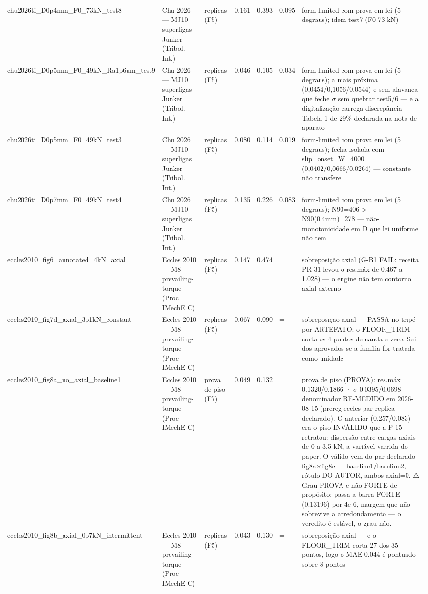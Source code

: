 \begin{table}[t]
\begin{tabular}{lllllll}
chu2026ti\_D0p4mm\_F0\_73kN\_test8 & Chu 2026 — MJ10 superligas Junker (Tribol. Int.) & replicas (F5) & 0.161 & 0.393 & 0.095 & form-limited com prova em lei (5 degraus); idem test7 (F0 73 kN) \\
chu2026ti\_D0p5mm\_F0\_49kN\_Ra1p6um\_test9 & Chu 2026 — MJ10 superligas Junker (Tribol. Int.) & replicas (F5) & 0.046 & 0.105 & 0.034 & form-limited com prova em lei (5 degraus); a mais próxima (0,0454/0,1056/0,0544) e sem alavanca que feche $\sigma$ sem quebrar test5/6 — e a digitalização carrega discrepância Tabela-1 de 29\% declarada na nota de aparato \\
chu2026ti\_D0p5mm\_F0\_49kN\_test3 & Chu 2026 — MJ10 superligas Junker (Tribol. Int.) & replicas (F5) & 0.080 & 0.114 & 0.019 & form-limited com prova em lei (5 degraus); fecha isolada com slip\_onset\_W=4000 (0,0402/0,0666/0,0264) — constante não transfere \\
chu2026ti\_D0p7mm\_F0\_49kN\_test4 & Chu 2026 — MJ10 superligas Junker (Tribol. Int.) & replicas (F5) & 0.135 & 0.226 & 0.083 & form-limited com prova em lei (5 degraus); N90=406 > N90(0,4mm)=278 — não-monotonicidade em D que lei uniforme não tem \\
eccles2010\_fig6\_annotated\_4kN\_axial & Eccles 2010 — M8 prevailing-torque (Proc IMechE C) & replicas (F5) & 0.147 & 0.474 & = & sobreposição axial (G-B1 FAIL: receita PR-31 levou o res.máx de 0.467 a 1.028) — o engine não tem contorno axial externo \\
eccles2010\_fig7d\_axial\_3p1kN\_constant & Eccles 2010 — M8 prevailing-torque (Proc IMechE C) & replicas (F5) & 0.067 & 0.090 & = & sobreposição axial — PASSA no tripé por ARTEFATO: o FLOOR\_TRIM corta os 4 pontos da cauda a zero. Sai dos aprovados se a família for tratada como unidade \\
eccles2010\_fig8a\_no\_axial\_baseline1 & Eccles 2010 — M8 prevailing-torque (Proc IMechE C) & prova de piso (F7) & 0.049 & 0.132 & = & prova de piso (PROVA): res.máx 0.1320/0.1866 · $\sigma$ 0.0395/0.0698 — denominador RE-MEDIDO em 2026-08-15 (prereg eccles-par-replica-declarado). O anterior (0.257/0.083) era o piso INVÁLIDO que a P-15 retratou: dispersão entre cargas axiais de 0 a 3,5 kN, a variável varrida do paper. O válido vem do par declarado fig8a$\times$fig8c — baseline1/baseline2, rótulo DO AUTOR, ambos axial=0. ⚠️ Grau PROVA e não FORTE de propósito: passa a barra FORTE (0.13196) por 4e-6, margem que não sobrevive a arredondamento — o veredito é estável, o grau não. \\
eccles2010\_fig8b\_axial\_0p7kN\_intermittent & Eccles 2010 — M8 prevailing-torque (Proc IMechE C) & replicas (F5) & 0.043 & 0.130 & = & sobreposição axial — e o FLOOR\_TRIM corta 27 dos 35 pontos, logo o MAE 0.044 é pontuado sobre 8 pontos \\

\end{tabular}
\end{table}
